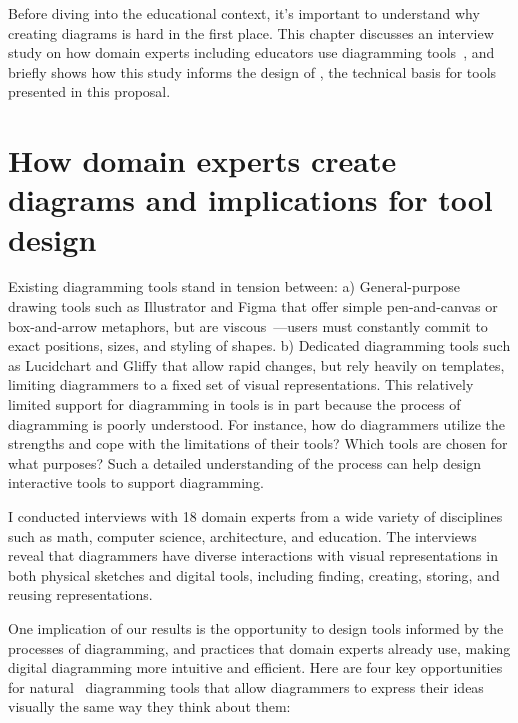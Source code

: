 

Before diving into the educational context, it's important to understand why creating diagrams is hard in the first place. This chapter discusses an interview study on how domain experts including educators use diagramming tools~\cite{naturalDiagramming}, and briefly shows how this study informs the design of \Penrose, the technical basis for tools presented in this proposal. 

\section{How domain experts create diagrams and implications for tool design}
\label{sec:naturalDiagramming}

Existing diagramming tools stand in tension between: a) General-purpose drawing tools such as Illustrator and Figma that offer simple pen-and-canvas or box-and-arrow metaphors, but are viscous~\cite{cognitiveDimensions}---users must constantly commit to exact positions, sizes, and styling of shapes. b) Dedicated diagramming tools such as Lucidchart and Gliffy that allow rapid changes, but rely heavily on templates, limiting diagrammers to a fixed set of visual representations. This relatively limited support for diagramming in tools is in part because the process of diagramming is poorly understood. For instance, how do diagrammers utilize the strengths and cope with the limitations of their tools? Which tools are chosen for what purposes?  Such a detailed understanding of the process can help design interactive tools to support diagramming.

I conducted interviews with 18 domain experts from a wide variety of disciplines such as math, computer science, architecture, and education. The interviews reveal that diagrammers have diverse interactions with visual representations in both physical sketches and digital tools, including finding, creating, storing, and reusing representations. 

One implication of our results is the opportunity to design tools informed by the processes of diagramming, and practices that domain experts already use, making digital diagramming more intuitive and efficient. Here are four key opportunities for natural~\cite{naturalProgramming} diagramming tools that allow diagrammers to express their ideas visually the same way they think about them:

